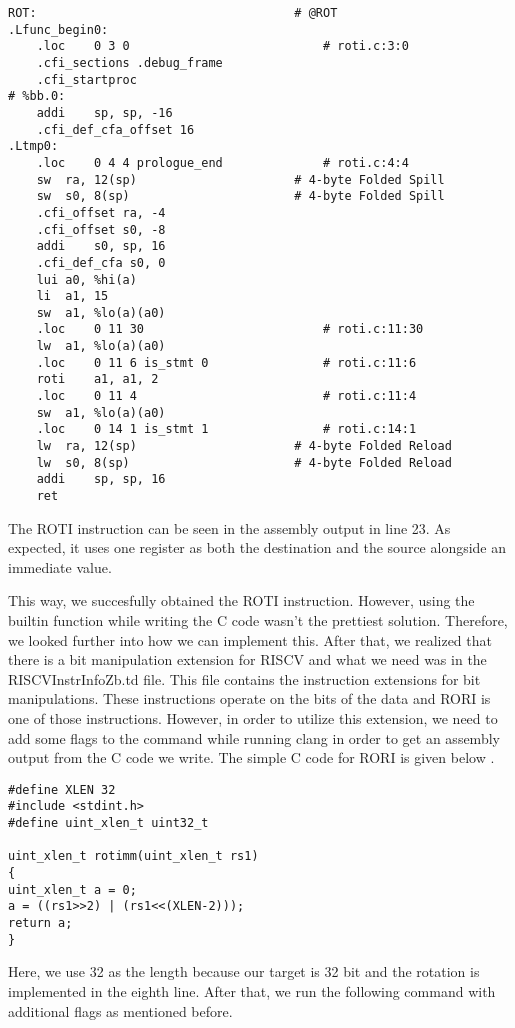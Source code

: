 \begin{lstlisting}
ROT:                                    # @ROT
.Lfunc_begin0:
	.loc	0 3 0                           # roti.c:3:0
	.cfi_sections .debug_frame
	.cfi_startproc
# %bb.0:
	addi	sp, sp, -16
	.cfi_def_cfa_offset 16
.Ltmp0:
	.loc	0 4 4 prologue_end              # roti.c:4:4
	sw	ra, 12(sp)                      # 4-byte Folded Spill
	sw	s0, 8(sp)                       # 4-byte Folded Spill
	.cfi_offset ra, -4
	.cfi_offset s0, -8
	addi	s0, sp, 16
	.cfi_def_cfa s0, 0
	lui	a0, %hi(a)
	li	a1, 15
	sw	a1, %lo(a)(a0)
	.loc	0 11 30                         # roti.c:11:30
	lw	a1, %lo(a)(a0)
	.loc	0 11 6 is_stmt 0                # roti.c:11:6
	roti	a1, a1, 2
	.loc	0 11 4                          # roti.c:11:4
	sw	a1, %lo(a)(a0)
	.loc	0 14 1 is_stmt 1                # roti.c:14:1
	lw	ra, 12(sp)                      # 4-byte Folded Reload
	lw	s0, 8(sp)                       # 4-byte Folded Reload
	addi	sp, sp, 16
	ret
\end{lstlisting}

The ROTI instruction can be seen in the assembly output in line 23. As expected, it uses one register as both  the destination and the source alongside an immediate value.

This way, we succesfully obtained the ROTI instruction. However, using the builtin function while writing the C code wasn’t the prettiest solution. Therefore, we looked further into how we can implement this. After that, we realized that there is a bit manipulation extension for RISCV and what we need was in the RISCVInstrInfoZb.td file. This file contains the instruction extensions for bit manipulations. These instructions operate on the bits of the data and RORI is one of those instructions. However, in order to utilize this extension, we need to add some flags to the command while running clang in order to get an assembly output from the C code we write. The simple C code for RORI is given below .%

\begin{lstlisting}
#define XLEN 32
#include <stdint.h>
#define uint_xlen_t uint32_t

uint_xlen_t rotimm(uint_xlen_t rs1)
{
uint_xlen_t a = 0;
a = ((rs1>>2) | (rs1<<(XLEN-2)));
return a;
}
\end{lstlisting}

Here, we use 32 as the length because our target is 32 bit and the rotation is implemented in the eighth line. After that, we run the following command with additional flags as mentioned before.

